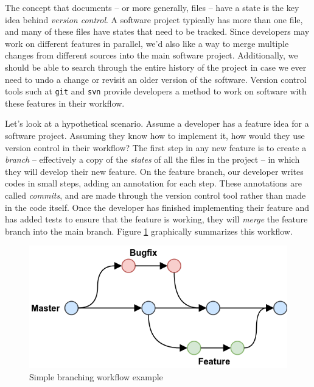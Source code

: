 \documentclass{anstrans}
\begin{document}
    The concept that documents -- or more generally, files -- have a state is the key idea behind {\it version control}. A software project typically has more than one file, and many of these files have states that need to be tracked. Since developers may work on different features in parallel, we'd also like a way to merge multiple changes from different sources into the main software project. Additionally, we should be able to search through the entire history of the project in case we ever need to undo a change or revisit an older version of the software. Version control tools such at \verb.git. and \verb.svn. provide developers a method to work on software with these features in their workflow.
    
    Let's look at a hypothetical scenario. Assume a developer has a feature idea for a software project. Assuming they know how to implement it, how would they use version control in their workflow? The first step in any new feature is to create a {\it branch} -- effectively a copy of the {\it states} of all the files in the project -- in which they will develop their new feature. On the feature branch, our developer writes codes in small steps, adding an annotation for each step. These annotations are called {\it commits}, and are made through the version control tool rather than made in the code itself. Once the developer has finished implementing their feature and has added tests to ensure that the feature is working, they will {\it merge} the feature branch into the main branch. Figure \ref{fig:gh-flow} graphically summarizes this workflow.
    
    \begin{figure}[ht] %
      \centering
      \includegraphics[width=\linewidth]{github-flow.png}
      \caption{Simple branching workflow example \cite{git_flow_fig}}
      \label{fig:gh-flow}
    \end{figure}
\end{document}
